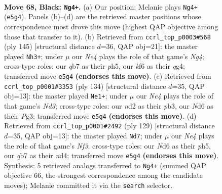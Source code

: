 \documentclass[11pt]{article}
\begin{document}
\clearpage

\begin{figure}[p]\centering
\begin{subfigure}{0.46\textwidth}\centering
\resizebox{\linewidth}{!}{%
\newchessgame
\chessboard[
  setfen={3k4/1Q6/P2n1K2/4n3/8/6q1/3N4/8 b - - 8 68},
  showmover=false,
  pgfstyle=straightmove, color=movearrow, markmove={e5-g4}
]}
\caption{}
\end{subfigure}\hfill
\begin{subfigure}{0.46\textwidth}\centering
\resizebox{\linewidth}{!}{%
\newchessgame
\chessboard[
  setfen={7k/8/8/6nP/5KQN/q7/8/8 b - - 12 73},
  showmover=false,
  pgfstyle=straightmove, color=movearrow, markmove={g5-h3}
]}
\caption{}
\end{subfigure}
\\[4pt]
\begin{subfigure}{0.46\textwidth}\centering
\resizebox{\linewidth}{!}{%
\newchessgame
\chessboard[
  setfen={8/8/8/8/3K2n1/1p1N2P1/2k5/8 w - - 6 68},
  showmover=false,
  pgfstyle=straightmove, color=movearrow, markmove={d3-e1}
]}
\caption{}
\end{subfigure}\hfill
\begin{subfigure}{0.46\textwidth}\centering
\resizebox{\linewidth}{!}{%
\newchessgame
\chessboard[
  setfen={7k/8/5nK1/7P/1p1N4/5P2/8/8 b - - 1 65},
  showmover=false,
  pgfstyle=straightmove, color=movearrow, markmove={f6-d7}
]}
\caption{}
\end{subfigure}
\caption{\textbf{Move 68, Black: \texttt{Ng4+}.} (a) Our position; Melanie plays \texttt{Ng4+} (\texttt{e5g4}). Panels (b)--(d) are the retrieved master positions whose correspondence most drove this move (highest QAP objective among those that transfer to it). (b) Retrieved from \texttt{ccrl\_top\_p0003\#568} (ply 145) [structural distance $d$=36, QAP obj=21]: the master played \texttt{Nh3+}; under $\mu$ our \emph{Ne4} plays the role of that game's \emph{Ng4}; cross-type roles: our \emph{q}b7 as their \emph{p}h5, our \emph{k}f6 as their \emph{q}g4; transferred move \texttt{e5g4} \textbf{(endorses this move)}. (c) Retrieved from \texttt{ccrl\_top\_p0001\#3353} (ply 134) [structural distance $d$=35, QAP obj=13]: the master played \texttt{Ne1+}; under $\mu$ our \emph{Ne4} plays the role of that game's \emph{Nd3}; cross-type roles: our \emph{n}d2 as their \emph{p}b3, our \emph{N}d6 as their \emph{P}g3; transferred move \texttt{e5g4} \textbf{(endorses this move)}. (d) Retrieved from \texttt{ccrl\_top\_p0001\#2492} (ply 129) [structural distance $d$=35, QAP obj=13]: the master played \texttt{Nd7}; under $\mu$ our \emph{Ne4} plays the role of that game's \emph{Nf3}; cross-type roles: our \emph{N}d6 as their \emph{p}h5, our \emph{q}b7 as their \emph{n}d4; transferred move \texttt{e5g4} \textbf{(endorses this move)}. Synthesis: 5 retrieved analogs transferred to \texttt{Ng4+} (summed QAP objective 66, the strongest correspondence among the candidate moves); Melanie committed it via the \texttt{search} selector.}
\label{fig:thought-m135}
\end{figure}
\end{document}
